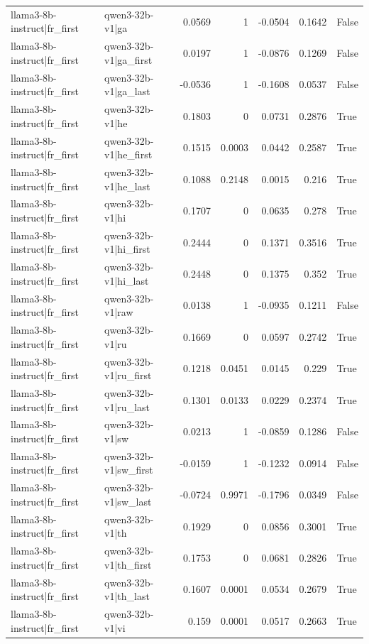 \begin{table}
\begin{tabular}{l l r r r r l}
llama3-8b-instruct|fr_first & qwen3-32b-v1|ga & 0.0569 & 1 & -0.0504 & 0.1642 & False \\
llama3-8b-instruct|fr_first & qwen3-32b-v1|ga_first & 0.0197 & 1 & -0.0876 & 0.1269 & False \\
llama3-8b-instruct|fr_first & qwen3-32b-v1|ga_last & -0.0536 & 1 & -0.1608 & 0.0537 & False \\
llama3-8b-instruct|fr_first & qwen3-32b-v1|he & 0.1803 & 0 & 0.0731 & 0.2876 & True \\
llama3-8b-instruct|fr_first & qwen3-32b-v1|he_first & 0.1515 & 0.0003 & 0.0442 & 0.2587 & True \\
llama3-8b-instruct|fr_first & qwen3-32b-v1|he_last & 0.1088 & 0.2148 & 0.0015 & 0.216 & True \\
llama3-8b-instruct|fr_first & qwen3-32b-v1|hi & 0.1707 & 0 & 0.0635 & 0.278 & True \\
llama3-8b-instruct|fr_first & qwen3-32b-v1|hi_first & 0.2444 & 0 & 0.1371 & 0.3516 & True \\
llama3-8b-instruct|fr_first & qwen3-32b-v1|hi_last & 0.2448 & 0 & 0.1375 & 0.352 & True \\
llama3-8b-instruct|fr_first & qwen3-32b-v1|raw & 0.0138 & 1 & -0.0935 & 0.1211 & False \\
llama3-8b-instruct|fr_first & qwen3-32b-v1|ru & 0.1669 & 0 & 0.0597 & 0.2742 & True \\
llama3-8b-instruct|fr_first & qwen3-32b-v1|ru_first & 0.1218 & 0.0451 & 0.0145 & 0.229 & True \\
llama3-8b-instruct|fr_first & qwen3-32b-v1|ru_last & 0.1301 & 0.0133 & 0.0229 & 0.2374 & True \\
llama3-8b-instruct|fr_first & qwen3-32b-v1|sw & 0.0213 & 1 & -0.0859 & 0.1286 & False \\
llama3-8b-instruct|fr_first & qwen3-32b-v1|sw_first & -0.0159 & 1 & -0.1232 & 0.0914 & False \\
llama3-8b-instruct|fr_first & qwen3-32b-v1|sw_last & -0.0724 & 0.9971 & -0.1796 & 0.0349 & False \\
llama3-8b-instruct|fr_first & qwen3-32b-v1|th & 0.1929 & 0 & 0.0856 & 0.3001 & True \\
llama3-8b-instruct|fr_first & qwen3-32b-v1|th_first & 0.1753 & 0 & 0.0681 & 0.2826 & True \\
llama3-8b-instruct|fr_first & qwen3-32b-v1|th_last & 0.1607 & 0.0001 & 0.0534 & 0.2679 & True \\
llama3-8b-instruct|fr_first & qwen3-32b-v1|vi & 0.159 & 0.0001 & 0.0517 & 0.2663 & True \\

\end{tabular}
\end{table}
